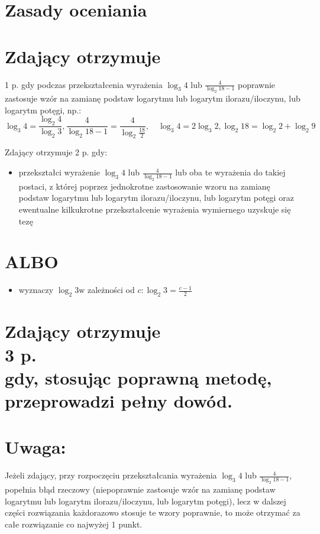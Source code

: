 \documentclass[10pt]{article}
\begin{document}
\section*{Zasady oceniania}
\section*{Zdający otrzymuje}
 1 p. gdy podczas przekształcenia wyrażenia $\log _{3} 4$ lub $\frac{4}{\log _{2} 18-1}$ poprawnie zastosuje wzór na zamianę podstaw logarytmu lub logarytm ilorazu/iloczynu, lub logarytm potęgi, np.:$$
\log _{3} 4=\frac{\log _{2} 4}{\log _{2} 3}, \frac{4}{\log _{2} 18-1}=\frac{4}{\log _{2} \frac{18}{2}}, \quad \log _{3} 4=2 \log _{3} 2, \log _{2} 18=\log _{2} 2+\log _{2} 9
$$

Zdający otrzymuje 2 p. gdy:

\begin{itemize}
  \item przekształci wyrażenie $\log _{3} 4$ lub $\frac{4}{\log _{2} 18-1}$ lub oba te wyrażenia do takiej postaci, z której poprzez jednokrotne zastosowanie wzoru na zamianę podstaw logarytmu lub logarytm ilorazu/iloczynu, lub logarytm potęgi oraz ewentualne kilkukrotne przekształcenie wyrażenia wymiernego uzyskuje się tezę
\end{itemize}

\section*{ALBO}
\begin{itemize}
  \item wyznaczy $\log _{2} 3 \mathrm{w}$ zależności od $c: \log _{2} 3=\frac{c-1}{2}$
\end{itemize}

\section*{Zdający otrzymuje \\
 3 p. \\
 gdy, stosując poprawną metodę, przeprowadzi pełny dowód.}
\section*{Uwaga:}
Jeżeli zdający, przy rozpoczęciu przekształcania wyrażenia $\log _{3} 4$ lub $\frac{4}{\log _{2} 18-1}$, popełnia błąd rzeczowy (niepoprawnie zastosuje wzór na zamianę podstaw logarytmu lub logarytm ilorazu/iloczynu, lub logarytm potęgi), lecz w dalszej części rozwiązania każdorazowo stosuje te wzory poprawnie, to może otrzymać za całe rozwiązanie co najwyżej 1 punkt.
\end{document}
